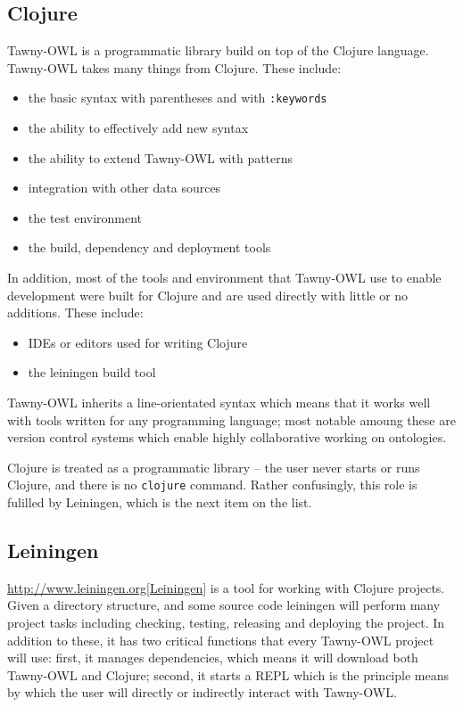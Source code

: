 \documentclass[11pt]{article}
\begin{document}
\subsection{Clojure}
\label{sec-3-2}

Tawny-OWL is a programmatic library build on top of the Clojure
language. Tawny-OWL takes many things from Clojure. These include:

\begin{itemize}
\item the basic syntax with parentheses and with \texttt{:keywords}
\item the ability to effectively add new syntax
\item the ability to extend Tawny-OWL with patterns
\item integration with other data sources
\item the test environment
\item the build, dependency and deployment tools
\end{itemize}

In addition, most of the tools and environment that Tawny-OWL use to
enable development were built for Clojure and are used directly with
little or no additions. These include:

\begin{itemize}
\item IDEs or editors used for writing Clojure
\item the leiningen build tool
\end{itemize}

Tawny-OWL inherits a line-orientated syntax which means that it works
well with tools written for any programming language; most notable
amoung these are version control systems which enable highly
collaborative working on ontologies.

Clojure is treated as a programmatic library -- the user never starts or
runs Clojure, and there is no \texttt{clojure} command. Rather confusingly,
this role is fulilled by Leiningen, which is the next item on the list.

\subsection{Leiningen}
\label{sec-3-3}

\url{http://www.leiningen.org[Leiningen}] is a tool for working with Clojure
projects. Given a directory structure, and some source code leiningen
will perform many project tasks including checking, testing, releasing
and deploying the project. In addition to these, it has two critical
functions that every Tawny-OWL project will use: first, it manages
dependencies, which means it will download both Tawny-OWL and Clojure;
second, it starts a REPL which is the principle means by which the user
will directly or indirectly interact with Tawny-OWL.
\end{document}
